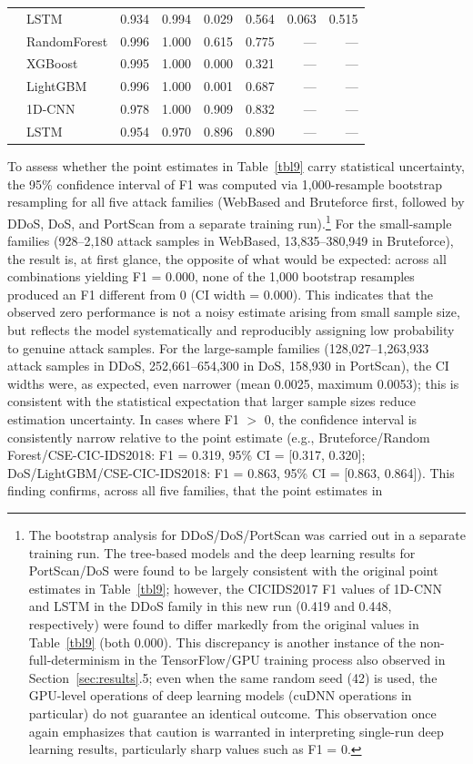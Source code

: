 \documentclass[a4paper,fleqn]{cas-sc}
\begin{document}
\begin{table}[width=\textwidth,cols=8,pos=htbp]
\begin{tabular*}{\tblwidth}{@{}llRRRRRR@{}}
 & LSTM & 0.934 & 0.994 & 0.029 & 0.564 & 0.063 & 0.515 \\
\addlinespace
{} & RandomForest & 0.996 & 1.000 & 0.615 & 0.775 & --- & --- \\
 & XGBoost & 0.995 & 1.000 & 0.000 & 0.321 & --- & --- \\
 & LightGBM & 0.996 & 1.000 & 0.001 & 0.687 & --- & --- \\
 & 1D-CNN & 0.978 & 1.000 & 0.909 & 0.832 & --- & --- \\
 & LSTM & 0.954 & 0.970 & 0.896 & 0.890 & --- & --- \\
\bottomrule
\end{tabular*}
\end{table}

To assess whether the point estimates in Table~\ref{tbl9} carry statistical uncertainty, the 95\% confidence interval of F1 was computed via 1,000-resample bootstrap resampling for all five attack families (WebBased and Bruteforce first, followed by DDoS, DoS, and PortScan from a separate training run).\footnote{The bootstrap analysis for DDoS/DoS/PortScan was carried out in a separate training run. The tree-based models and the deep learning results for PortScan/DoS were found to be largely consistent with the original point estimates in Table~\ref{tbl9}; however, the CICIDS2017 F1 values of 1D-CNN and LSTM in the DDoS family in this new run (0.419 and 0.448, respectively) were found to differ markedly from the original values in Table~\ref{tbl9} (both 0.000). This discrepancy is another instance of the non-full-determinism in the TensorFlow/GPU training process also observed in Section~\ref{sec:results}.5; even when the same random seed (42) is used, the GPU-level operations of deep learning models (cuDNN operations in particular) do not guarantee an identical outcome. This observation once again emphasizes that caution is warranted in interpreting single-run deep learning results, particularly sharp values such as F1 = 0.} For the small-sample families (928--2,180 attack samples in WebBased, 13,835--380,949 in Bruteforce), the result is, at first glance, the opposite of what would be expected: across all combinations yielding F1 = 0.000, none of the 1,000 bootstrap resamples produced an F1 different from 0 (CI width = 0.000). This indicates that the observed zero performance is not a noisy estimate arising from small sample size, but reflects the model systematically and reproducibly assigning low probability to genuine attack samples. For the large-sample families (128,027--1,263,933 attack samples in DDoS, 252,661--654,300 in DoS, 158,930 in PortScan), the CI widths were, as expected, even narrower (mean 0.0025, maximum 0.0053); this is consistent with the statistical expectation that larger sample sizes reduce estimation uncertainty. In cases where F1 $>$ 0, the confidence interval is consistently narrow relative to the point estimate (e.g., Bruteforce/Random Forest/CSE-CIC-IDS2018: F1 = 0.319, 95\% CI = [0.317, 0.320]; DoS/LightGBM/CSE-CIC-IDS2018: F1 = 0.863, 95\% CI = [0.863, 0.864]). This finding confirms, across all five families, that the point estimates in 
\end{document}
